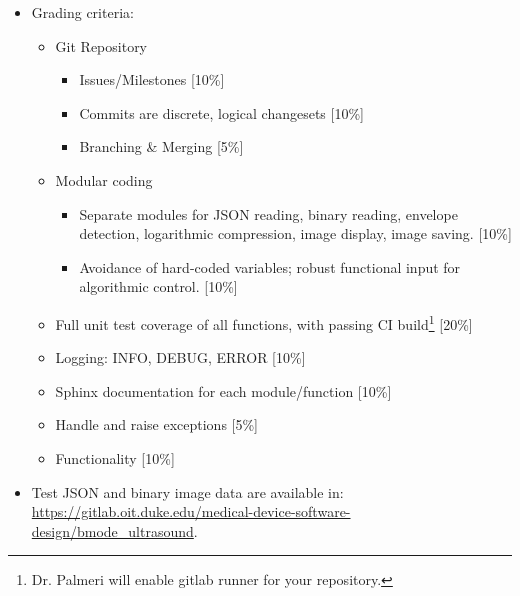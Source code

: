 \begin{itemize}
\item Grading criteria:
\begin{itemize}
    \item Git Repository
        \begin{itemize}
            \item Issues/Milestones [10\%]
            \item Commits are discrete, logical changesets [10\%]
            \item Branching \& Merging [5\%]
        \end{itemize}
    \item Modular coding
        \begin{itemize}
            \item Separate modules for JSON reading, binary reading, envelope
                detection, logarithmic compression, image display, image
                saving. [10\%]
            \item Avoidance of hard-coded variables; robust functional input
                for algorithmic control. [10\%]
        \end{itemize}
    \item Full unit test coverage of all functions, with passing CI
        build\footnote{Dr. Palmeri will enable gitlab runner for your
        repository.} [20\%]
    \item Logging: INFO, DEBUG, ERROR [10\%]
    \item Sphinx documentation for each module/function [10\%]
    \item Handle and raise exceptions [5\%]
    \item Functionality [10\%]
\end{itemize}

\item Test JSON and binary image data are available in:\\
      \url{https://gitlab.oit.duke.edu/medical-device-software-design/bmode_ultrasound}.
\end{itemize}




